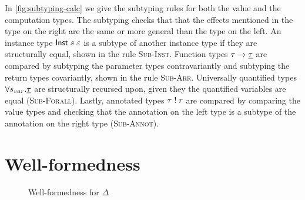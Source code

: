 {In \cref{fig:subtyping-calc} we give the subtyping rules for both the value and the computation types.
The subtyping checks that that the effects mentioned in the type on the right are the same or more general than the type on the left.
An instance type $\mathsf{Inst} \; s \; \varepsilon$ is a subtype of another instance type if they are structurally equal, shown in the rule \textsc{Sub-Inst}.
Function types $\tau \rightarrow \underline{\tau}$ are compared by subtyping the parameter types contravariantly and subtyping the return types covariantly, shown in the rule \textsc{Sub-Arr}.
Universally quantified types $\forall s_{var} . \underline{\tau}$ are structurally recursed upon, given they the quantified variables are equal (\textsc{Sub-Forall}).
Lastly, annotated types $\tau \; ! \; r$ are compared by comparing the value types and checking that the annotation on the left type is a subtype of the annotation on the right type (\textsc{Sub-Annot}).

\section{Well-formedness}
\label{sec:wellformedness}

\begin{figure}[h]
\caption{Well-formedness for $\Delta$}
\centering
{}
\end{figure}

}
